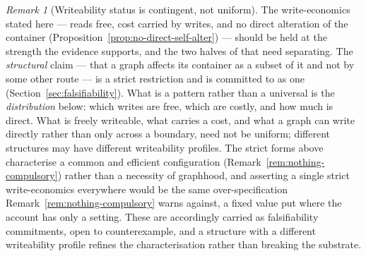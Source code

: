 \documentclass[11pt,a4paper]{article}
\theoremstyle{remark}\newtheorem{remark}[definition]{Remark}
\begin{document}
\begin{remark}[Writeability status is contingent, not uniform]\label{rem:writeability}
The write-economics stated here --- reads free, cost carried by writes, and no direct alteration of the container (Proposition~\ref{prop:no-direct-self-alter}) --- should be held at the strength the evidence supports, and the two halves of that need
separating. The \emph{structural} claim --- that a graph affects its container as a subset of it and not
by some other route --- is a strict restriction and is committed to as one
(Section~\ref{sec:falsifiability}). What is a pattern rather than a universal is the \emph{distribution}
below: which writes are free, which are costly, and how much is direct. What is freely writeable, what carries a cost, and what a graph can write directly rather than only across a boundary, need not be uniform; different structures may have different writeability profiles. The strict forms above characterise a common and efficient configuration (Remark~\ref{rem:nothing-compulsory}) rather than a necessity of graphhood, and asserting a single strict write-economics everywhere would be the same over-specification Remark~\ref{rem:nothing-compulsory} warns against, a fixed value put where the account has only a setting. These are accordingly carried as falsifiability commitments, open to counterexample, and a structure with a different writeability profile refines the characterisation rather than breaking the substrate.
\end{remark}
\end{document}
